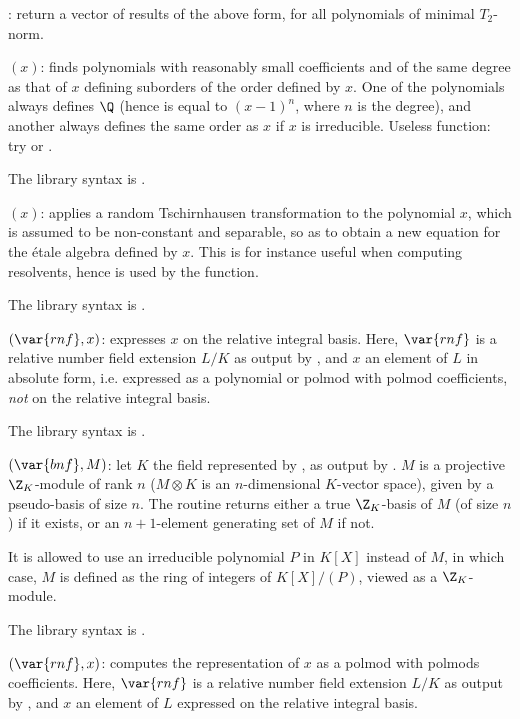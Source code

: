 \item {}: return a vector of results of the above form, for all
polynomials of minimal $T_2$-norm.

$(x)$: \label{se:polredord}finds polynomials with reasonably small
coefficients and of the same degree as that of $x$ defining suborders of the
order defined by $x$. One of the polynomials always defines $\Q$ (hence
is equal to $(x-1)^n$, where $n$ is the degree), and another always defines
the same order as $x$ if $x$ is irreducible. Useless function: try
 or .

The library syntax is .

$(x)$: \label{se:poltschirnhaus}applies a random Tschirnhausen
transformation to the polynomial $x$, which is assumed to be non-constant
and separable, so as to obtain a new equation for the \'etale algebra
defined by $x$. This is for instance useful when computing resolvents,
hence is used by the  function.

The library syntax is .

$(\var{rnf},x)$: \label{se:rnfalgtobasis}expresses $x$ on the relative
integral basis. Here, $\var{rnf}$ is a relative number field extension $L/K$
as output by , and $x$ an element of $L$ in absolute form, i.e.
expressed as a polynomial or polmod with polmod coefficients, \emph{not} on
the relative integral basis.

The library syntax is .

$(\var{bnf},M)$: \label{se:rnfbasis}let $K$ the field represented by
, as output by . $M$ is a projective $\Z_K$-module
of rank $n$ ($M\otimes K$ is an $n$-dimensional $K$-vector space), given by a
pseudo-basis of size $n$. The routine returns either a true $\Z_K$-basis of
$M$ (of size $n$) if it exists, or an $n+1$-element generating set of $M$ if
not.

It is allowed to use an irreducible polynomial $P$ in $K[X]$ instead of $M$,
in which case, $M$ is defined as the ring of integers of $K[X]/(P)$, viewed
as a $\Z_K$-module.

The library syntax is .

$(\var{rnf},x)$: \label{se:rnfbasistoalg}computes the representation of $x$
as a polmod with polmods coefficients. Here, $\var{rnf}$ is a relative number
field extension $L/K$ as output by , and $x$ an element of
$L$ expressed on the relative integral basis.

